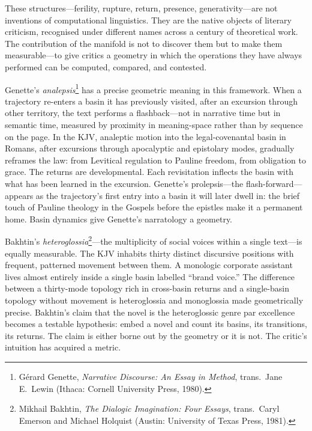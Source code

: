 These structures---ferility, rupture, return, presence, generativity---are not inventions of computational linguistics. They are the native objects of literary criticism, recognised under different names across a century of theoretical work. The contribution of the manifold is not to discover them but to make them measurable---to give critics a geometry in which the operations they have always performed can be computed, compared, and contested.

Genette's \emph{analepsis}\footnote{G\'{e}rard Genette, \emph{Narrative Discourse: An Essay in Method}, trans.\ Jane E.\ Lewin (Ithaca: Cornell University Press, 1980).} has a precise geometric meaning in this framework. When a trajectory re-enters a basin it has previously visited, after an excursion through other territory, the text performs a flashback---not in narrative time but in semantic time, measured by proximity in meaning-space rather than by sequence on the page. In the KJV, analeptic motion into the legal-covenantal basin in Romans, after excursions through apocalyptic and epistolary modes, gradually reframes the law: from Levitical regulation to Pauline freedom, from obligation to grace. The returns are developmental. Each revisitation inflects the basin with what has been learned in the excursion. Genette's prolepsis---the flash-forward---appears as the trajectory's first entry into a basin it will later dwell in: the brief touch of Pauline theology in the Gospels before the epistles make it a permanent home. Basin dynamics give Genette's narratology a geometry.

Bakhtin's \emph{heteroglossia}\footnote{Mikhail Bakhtin, \emph{The Dialogic Imagination: Four Essays}, trans.\ Caryl Emerson and Michael Holquist (Austin: University of Texas Press, 1981).}---the multiplicity of social voices within a single text---is equally measurable. The KJV inhabits thirty distinct discursive positions with frequent, patterned movement between them. A monologic corporate assistant lives almost entirely inside a single basin labelled ``brand voice.'' The difference between a thirty-mode topology rich in cross-basin returns and a single-basin topology without movement is heteroglossia and monoglossia made geometrically precise. Bakhtin's claim that the novel is the heteroglossic genre par excellence becomes a testable hypothesis: embed a novel and count its basins, its transitions, its returns. The claim is either borne out by the geometry or it is not. The critic's intuition has acquired a metric.

